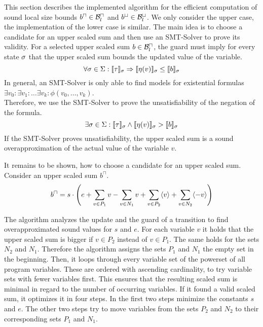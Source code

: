 This section describes the implemented algorithm for the efficient computation of sound local size bounds $b^\sqcap \in \mathcal{B}^\sqcap_l$ and $b^\sqcup \in \mathcal{B}^\sqcup_l$.
We only consider the upper case, the implementation of the lower case is similar.
The main idea is to choose a candidate for an upper scaled sum and then use an SMT-Solver to prove its validity.
For a selected upper scaled sum $b \in \mathcal{B}^\sqcap_l$, the guard must imply for every state $\sigma$ that the upper scaled sum bounds the updated value of the variable.
\[ \forall \sigma \in \Sigma: \llbracket \tau \rrbracket_{\sigma} \Rightarrow \llbracket \eta(v) \rrbracket_{\sigma} \leq \llbracket b \rrbracket_{\sigma} \]
In general, an SMT-Solver is only able to find models for existential formulas $\exists v_0: \exists v_1: \dots \exists v_k: \phi(v_0, \dots, v_k)$. \cite{smt} \\
Therefore, we use the SMT-Solver to prove the unsatisfiability of the negation of the formula.
\[ \exists \sigma \in \Sigma: \llbracket \tau \rrbracket_{\sigma} \wedge \llbracket \eta(v) \rrbracket_{\sigma} > \llbracket b \rrbracket_{\sigma} \]
If the SMT-Solver proves unsatisfiability, the upper scaled sum is a sound overapproximation of the actual value of the variable $v$.

It remains to be shown, how to choose a candidate for an upper scaled sum.
Consider an upper scaled sum $b^\sqcap$.
\[ b^\sqcap = s \cdot \left(
e
+ \sum_{v \in P_1} v
- \sum_{v \in N_1} v
+ \sum_{v \in P_2} \langle v\rangle
+ \sum_{v \in N_2} \langle-v\rangle
\right)
\]

The algorithm analyzes the update and the guard of a transition to find overapproximated sound values for $s$ and $e$.
For each variable $v$ it holds that the upper scaled sum is bigger if $v \in P_2$ instead of $v \in P_1$.
The same holds for the sets $N_2$ and $N_1$.
Therefore the algorithm assigns the sets $P_1$ and $N_1$ the empty set in the beginning. 
Then, it loops through every variable set of the powerset of all program variables.
These are ordered with ascending cardinality, to try variable sets with fewer variables first.
This ensures that the resulting scaled sum is minimal in regard to the number of occurring variables.
If it found a valid scaled sum, it optimizes it in four steps.
In the first two steps minimize the constants $s$ and $e$.
The other two steps try to move variables from the sets $P_2$ and $N_2$ to their corresponding sets $P_1$ and $N_1$.

